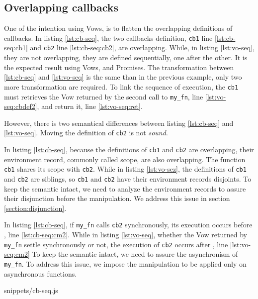 \subsection{Overlapping callbacks} \label{section:overlapping-callbacks}

One of the intention using Vows, is to flatten the overlapping definitions of callbacks.
In listing \ref{lst:cb-seq}, the two callbacks definition, \texttt{cb1} line \ref{lst:cb-seq:cb1} and \texttt{cb2} line \ref{lst:cb-seq:cb2}, are overlapping.
While, in listing \ref{lst:vo-seq}, they are not overlapping, they are defined sequentially, one after the other.
It is the expected result using Vows, and Promises.
The transformation between \ref{lst:cb-seq} and \ref{lst:vo-seq} is the same than in the previous example, only two more transformation are required.
To link the sequence of execution, the \texttt{cb1} must retrieves the Vow returned by the second call to \texttt{my_fn}, line \ref{lst:vo-seq:cbdef2}, and return it, line \ref{lst:vo-seq:ret}.

However, there is two semantical differences between listing \ref{lst:cb-seq} and \ref{lst:vo-seq}.
Moving the definition of \texttt{cb2} is not \textit{sound}.

In listing \ref{lst:cb-seq}, because the definitions of \texttt{cb1} and \texttt{cb2} are overlapping, their environment record, commonly called scope, are also overlapping.
The function \texttt{cb1} shares its scope with \texttt{cb2}.
While in listing \ref{lst:vo-sez}, the definitions of \texttt{cb1} and \texttt{cb2} are siblings, so \texttt{cb1} and \texttt{cb2} have their environment records disjoints.
To keep the semantic intact, we need to analyze the environment records to assure their disjunction before the manipulation. 
We address this issue in section \ref{section:disjunction}.

In listing \ref{lst:cb-seq}, if \texttt{my\_fn} calls \texttt{cb2} synchronously, its execution occurs before , line \ref{lst:cb-seq:cm2}.
While in listing \ref{lst:vo-seq}, whether the Vow returned by \texttt{my\_fn} settle synchronously or not, the execution of \texttt{cb2} occurs after , line \ref{lst:vo-seq:cm2}
To keep the semantic intact, we need to assure the asynchronism of \texttt{my\_fn}.
To address this issue, we impose the manipulation to be applied only on asynchronous functions.

             {snippets/cb-seq.js}

